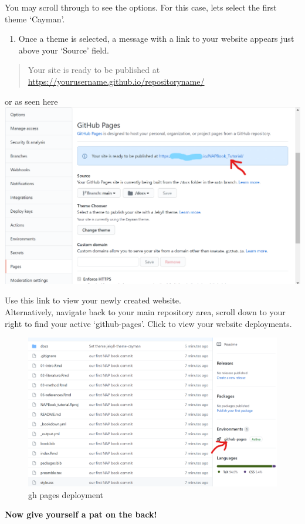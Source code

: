 \documentclass[
]{book}
\providecommand{\tightlist}{%
  \setlength{\itemsep}{0pt}\setlength{\parskip}{0pt}}
\begin{document}
You may scroll through to see the options. For this case, lets select the first theme `Cayman'.

\begin{enumerate}
\def\labelenumi{\arabic{enumi}.}
\setcounter{enumi}{3}
\tightlist
\item
  Once a theme is selected, a message with a link to your website appears just above your `Source' field.
\end{enumerate}

\begin{quote}
Your site is ready to be published at \url{https://yourusername.github.io/repositoryname/}
\end{quote}

or as seen here \includegraphics{tutorial_screenshots/gh_pageslink.png}

Use this link to view your newly created website.\\
Alternatively, navigate back to your main repository area, scroll down to your right to find your active `github-pages'. Click to view your website deployments.

\begin{figure}
\centering
\includegraphics{tutorial_screenshots/gh_pages_deploy.png}
\caption{gh pages deployment}
\end{figure}

\textbf{Now give yourself a pat on the back!}

  
\end{document}
